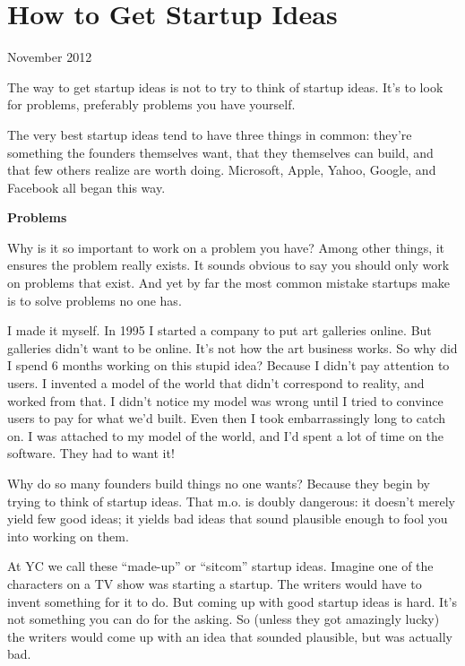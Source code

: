 \chapter{How to Get Startup Ideas}

November 2012

The way to get startup ideas is not to try to think of startup ideas.
It's to look for problems, preferably problems you have yourself.

The very best startup ideas tend to have three things in common: they're
something the founders themselves want, that they themselves can build,
and that few others realize are worth doing. Microsoft, Apple, Yahoo,
Google, and Facebook all began this way.

\textbf{Problems}

Why is it so important to work on a problem you have? Among other
things, it ensures the problem really exists. It sounds obvious to say
you should only work on problems that exist. And yet by far the most
common mistake startups make is to solve problems no one has.

I made it myself. In 1995 I started a company to put art galleries
online. But galleries didn't want to be online. It's not how the art
business works. So why did I spend 6 months working on this stupid idea?
Because I didn't pay attention to users. I invented a model of the world
that didn't correspond to reality, and worked from that. I didn't notice
my model was wrong until I tried to convince users to pay for what we'd
built. Even then I took embarrassingly long to catch on. I was attached
to my model of the world, and I'd spent a lot of time on the software.
They had to want it!

Why do so many founders build things no one wants? Because they begin by
trying to think of startup ideas. That m.o. is doubly dangerous: it
doesn't merely yield few good ideas; it yields bad ideas that sound
plausible enough to fool you into working on them.

At YC we call these ``made-up'' or ``sitcom'' startup ideas. Imagine one
of the characters on a TV show was starting a startup. The writers would
have to invent something for it to do. But coming up with good startup
ideas is hard. It's not something you can do for the asking. So (unless
they got amazingly lucky) the writers would come up with an idea that
sounded plausible, but was actually bad.

